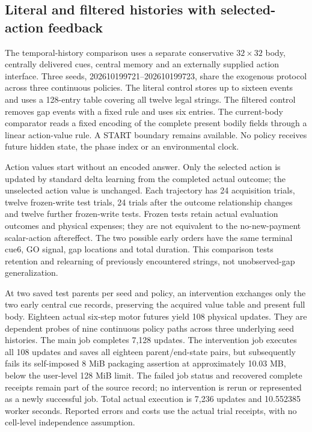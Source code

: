 \subsection*{Literal and filtered histories with selected-action feedback}

The temporal-history comparison uses a separate conservative $32\times32$ body, centrally delivered cues, central memory and an externally supplied action interface. Three seeds, 202610199721--202610199723, share the exogenous protocol across three continuous policies. The literal control stores up to sixteen events and uses a 128-entry table covering all twelve legal strings. The filtered control removes gap events with a fixed rule and uses six entries. The current-body comparator reads a fixed encoding of the complete present bodily fields through a linear action-value rule. A START boundary remains available. No policy receives future hidden state, the phase index or an environmental clock.

Action values start without an encoded answer. Only the selected action is updated by standard delta learning from the completed actual outcome; the unselected action value is unchanged. Each trajectory has 24 acquisition trials, twelve frozen-write test trials, 24 trials after the outcome relationship changes and twelve further frozen-write tests. Frozen tests retain actual evaluation outcomes and physical expenses; they are not equivalent to the no-new-payment scalar-action aftereffect. The two possible early orders have the same terminal cue6, GO signal, gap locations and total duration. This comparison tests retention and relearning of previously encountered strings, not unobserved-gap generalization.

At two saved test parents per seed and policy, an intervention exchanges only the two early central cue records, preserving the acquired value table and present full body. Eighteen actual six-step motor futures yield 108 physical updates. They are dependent probes of nine continuous policy paths across three underlying seed histories. The main job completes 7,128 updates. The intervention job executes all 108 updates and saves all eighteen parent/end-state pairs, but subsequently fails its self-imposed 8 MiB packaging assertion at approximately 10.03 MB, below the user-level 128 MiB limit. The failed job status and recovered complete receipts remain part of the source record; no intervention is rerun or represented as a newly successful job. Total actual execution is 7,236 updates and 10.552385 worker seconds. Reported errors and costs use the actual trial receipts, with no cell-level independence assumption.

